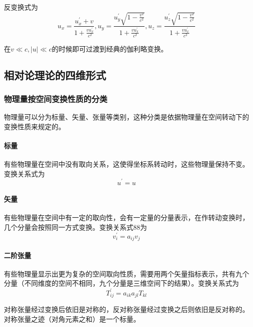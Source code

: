 \documentclass[UTF8]{ctexart}
\begin{document}
\noindent 反变换式为
\begin{equation}
    u_{x}=\frac{u_{x}^{\prime}+v}{1+\frac{v u_{x}^{\prime}}{c^{2}}}, u_{y}=\frac{u_{y}^{\prime} \sqrt{1-\frac{v^{2}}{c^{2}}}}{1+\frac{v u_{x}^{\prime}}{c^{2}}}, u_{z}=\frac{u_{z}^{\prime} \sqrt{1-\frac{v^{2}}{c^{2}}}}{1+\frac{v u_{x}^{\prime}}{c^{2}}}
\end{equation}

    在$v \ll c,|u| \ll c$的时候即可过渡到经典的伽利略变换。

    \subsection{相对论理论的四维形式}
    \subsubsection{物理量按空间变换性质的分类}
    物理量可以分为标量、矢量、张量等类别，这种分类是依据物理量在空间转动下的变换性质来规定的。

    \paragraph{标量}
    有些物理量在空间中没有取向关系，这使得坐标系转动时，这些物理量保持不变。变换关系式为
    \begin{equation}
        u^{\prime} = u
    \end{equation}

    \paragraph{矢量}
    有些物理量在空间中有一定的取向性，会有一定量的分量表示，在作转动变换时，几个分量会按照同一方式变换。变换关系式88为
    \begin{equation}
        v_i^{\prime} = a_{ij} v_j
    \end{equation}

    \paragraph{二阶张量}
    有些物理量显示出更为复杂的空间取向性质，需要用两个矢量指标表示，共有九个分量（不同维度的空间不相同，九个分量是三维空间下的结果）。变换关系式为
    \begin{equation}
        T^{\prime}_{ij} = a_{ik} a_{jl} T_{kl}
    \end{equation}

\noindent 对称张量经过变换后依旧是对称的，反对称张量经过变换之后则依旧是反对称的。对称张量之迹（对角元素之和）是一个标量。
\end{document}
